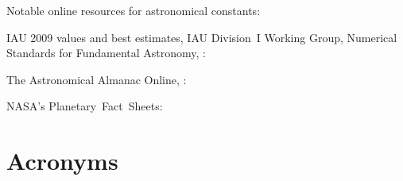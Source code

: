\bigskip

\noindent Notable online resources for astronomical constants:
\begin{itemize*}
	\item IAU 2009 values and best estimates, IAU Division~I Working Group, Numerical Standards for Fundamental Astronomy, \citet{Luzum2011}:\\
	
	\item The Astronomical Almanac Online, \citet{USNAO2017}:\\
	
	\item NASA's Planetary~Fact~Sheets:\\
	
\end{itemize*}


\newpage

\section{Acronyms}
\label{sec:acronyms}


